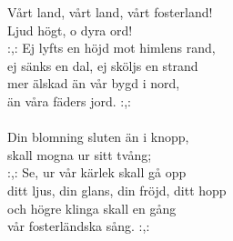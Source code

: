 
Vårt land, vårt land, vårt fosterland! \\ Ljud högt, o dyra ord! \\ :,: Ej lyfts en höjd mot himlens rand, \\ ej sänks en dal, ej sköljs en strand \\ mer älskad än vår bygd i nord, \\ än våra fäders jord. :,: \\ \hspace{10mm} \\ Din blomning sluten än i knopp, \\ skall mogna ur sitt tvång; \\ :,: Se, ur vår kärlek skall gå opp \\ ditt ljus, din glans, din fröjd, ditt hopp \\ och högre klinga skall en gång \\ vår fosterländska sång. :,: